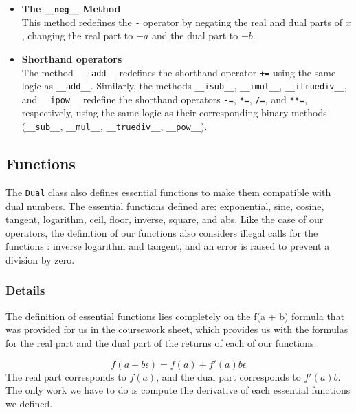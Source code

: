 \documentclass[a4paper,12pt]{article}
\begin{document}
\begin{itemize}
    \item \textbf{The \texttt{\_\_neg\_\_} Method} \\
    This method redefines the \texttt{-} operator by negating the real and dual parts of \(x\), changing the real part to \(-a\) and the dual part to \(-b\).
  \item \textbf{Shorthand operators} \\
The method \texttt{\_\_iadd\_\_} redefines the shorthand operator \texttt{+=} using the same logic as \texttt{\_\_add\_\_}.
Similarly, the methods \texttt{\_\_isub\_\_}, \texttt{\_\_imul\_\_}, \texttt{\_\_itruediv\_\_}, and \texttt{\_\_ipow\_\_} redefine the shorthand operators \texttt{-=}, \texttt{*=}, \texttt{/=}, and \texttt{**=}, respectively, using the same logic as their corresponding binary methods (\texttt{\_\_sub\_\_}, \texttt{\_\_mul\_\_}, \texttt{\_\_truediv\_\_}, \texttt{\_\_pow\_\_}).
\end{itemize}

\subsection{Functions}
The \texttt{Dual} class also defines essential functions to make them compatible with dual numbers. The essential functions defined are: exponential, sine, cosine, tangent, logarithm, ceil, floor, inverse, square, and abs.
Like the case of our operators, the definition of our functions also considers illegal calls for the functions : inverse logarithm and tangent, and an error is raised to prevent a division by zero.

\subsubsection{Details}
The definition of essential functions lies completely on the f(a + b\epsilon\)) formula that was provided for us in the coursework sheet, which provides us with the formulas for the real part and the dual part of the returns of each of our functions:

\[
f(a + b\epsilon) = f(a) + f'(a)b\epsilon
\]
The real part corresponds to $f(a)$, and the dual part corresponds to $f'(a)b$.
The only work we have to do is compute the derivative of each essential functions we defined.
\end{document}

